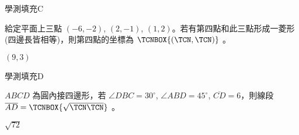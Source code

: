     \begin{QUESTION}
        \begin{ExamInfo}{95}{學測}{填充}{C}
        \end{ExamInfo}
        \begin{ExamAnsRateInfo}{49}{88}{50}{9}
        \end{ExamAnsRateInfo}
        \begin{QBODY}
            給定平面上三點 $(-6, -2)$, $(2, -1)$, $(1, 2)$。若有第四點和此三點形成一菱形(四邊長皆相等)，則第四點的坐標為 $\TCNBOX{(\TCN,\TCN)}$ 。
        \end{QBODY}
        \begin{QFROMS}
        \end{QFROMS}
        \begin{QTAGS}\end{QTAGS}
        \begin{QANS}
            $(9,3)$
        \end{QANS}
        \begin{QSOLLIST}
        \end{QSOLLIST}
        \begin{QEMPTYSPACE}
        \end{QEMPTYSPACE}
    \end{QUESTION}
    \begin{QUESTION}
        \begin{ExamInfo}{95}{學測}{填充}{D}
        \end{ExamInfo}
        \begin{ExamAnsRateInfo}{34}{72}{26}{4}
        \end{ExamAnsRateInfo}
        \begin{QBODY}
            $ABCD$ 為圓內接四邊形，若 $\angle DBC = 30 ^\circ$, $\angle ABD = 45^\circ$, $\overline{CD}=6$，則線段 $\overline{AD}= \TCNBOX{\sqrt{\TCN\TCN}}$ 。
        \end{QBODY}
        \begin{QFROMS}
        \end{QFROMS}
        \begin{QTAGS}\end{QTAGS}
        \begin{QANS}
            $\sqrt{72}$
        \end{QANS}
        \begin{QSOLLIST}
        \end{QSOLLIST}
        \begin{QEMPTYSPACE}
        \end{QEMPTYSPACE}
    \end{QUESTION}
